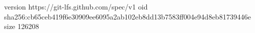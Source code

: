 version https://git-lfs.github.com/spec/v1
oid sha256:cb65ceb419f6e30909ee6095a2ab102eb8dd13b7583ff004e94d8eb81739446e
size 126208

